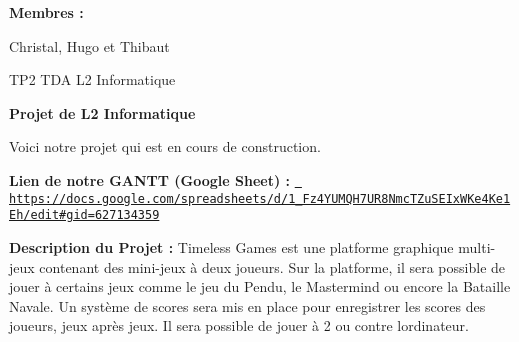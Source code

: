 \label{index_md__info_etu_l2info_s202604_Timeless_Games_README}%
%
 {\bfseries{Membres \+:}}

Christal, Hugo et Thibaut

TP2 TDA L2 Informatique

{\bfseries{Projet de L2 Informatique}}

Voici notre projet qui est en cours de construction.

{\bfseries{Lien de notre GANTT (Google Sheet) \+:}} \href{https://docs.google.com/spreadsheets/d/1_Fz4YUMQH7UR8NmcTZuSEIxWKe4Ke1Eh/edit\#gid=627134359}{\texttt{ https\+://docs.\+google.\+com/spreadsheets/d/1\+\_\+\+Fz4\+YUMQH7\+UR8\+Nmc\+TZu\+SEIx\+WKe4\+Ke1\+Eh/edit\#gid=627134359}}

{\bfseries{Description du Projet \+:}} Timeless Games est une platforme graphique multi-\/jeux contenant des mini-\/jeux à deux joueurs. Sur la platforme, il sera possible de jouer à certains jeux comme le jeu du Pendu, le Mastermind ou encore la Bataille Navale. Un système de scores sera mis en place pour enregistrer les scores des joueurs, jeux après jeux. Il sera possible de jouer à 2 ou contre l\textquotesingle{}ordinateur. 